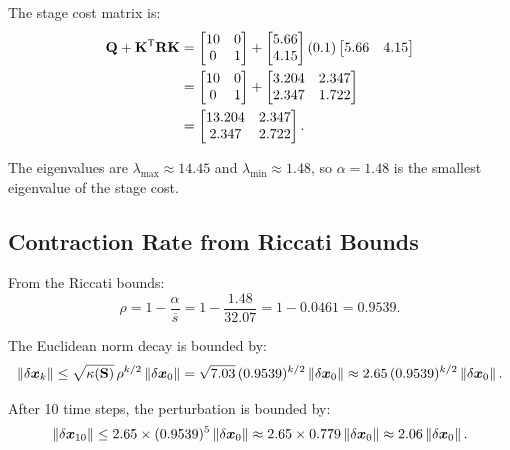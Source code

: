 The stage cost matrix is:
\begin{align}
\mathbf{Q} + \mathbf{K}^{\mathsf{T}}\mathbf{R}\mathbf{K} &= \begin{bmatrix} 10 & 0 \\ 0 & 1 \end{bmatrix}
                                       + \begin{bmatrix} 5.66 \\ 4.15 \end{bmatrix}(0.1)\begin{bmatrix} 5.66 & 4.15 \end{bmatrix} \\
&= \begin{bmatrix} 10 & 0 \\ 0 & 1 \end{bmatrix}
   + \begin{bmatrix} 3.204 & 2.347 \\ 2.347 & 1.722 \end{bmatrix} \\
&= \begin{bmatrix} 13.204 & 2.347 \\ 2.347 & 2.722 \end{bmatrix}.
\label{eq:ch6:stage-cost}
\end{align}

The eigenvalues are $\lambda_{\max} \approx 14.45$ and $\lambda_{\min} \approx 1.48$, so $\alpha = 1.48$ is the smallest
eigenvalue of the stage cost.

\subsection{Contraction Rate from Riccati Bounds}

From the Riccati bounds:
\begin{equation}
\rho = 1 - \frac{\alpha}{\overline{s}} = 1 - \frac{1.48}{32.07} = 1 - 0.0461 = 0.9539.
\label{eq:ch6:rho-example}
\end{equation}

The Euclidean norm decay is bounded by:
\begin{equation}
\left\lVert \delta\bm{x}_k \right\rVert \leq \sqrt{\kappa(\mathbf{S})} \, \rho^{k/2} \left\lVert \delta\bm{x}_0 \right\rVert
             = \sqrt{7.03} \, (0.9539)^{k/2} \left\lVert \delta\bm{x}_0 \right\rVert
             \approx 2.65 \, (0.9539)^{k/2} \left\lVert \delta\bm{x}_0 \right\rVert.
\label{eq:ch6:euclidean-decay}
\end{equation}

After 10 time steps, the perturbation is bounded by:
\begin{equation}
\left\lVert \delta\bm{x}_{10} \right\rVert \leq 2.65 \times (0.9539)^5 \left\lVert \delta\bm{x}_0 \right\rVert \approx 2.65 \times 0.779 \left\lVert \delta\bm{x}_0 \right\rVert \approx 2.06 \left\lVert \delta\bm{x}_0 \right\rVert.
\label{eq:ch6:10step}
\end{equation}

